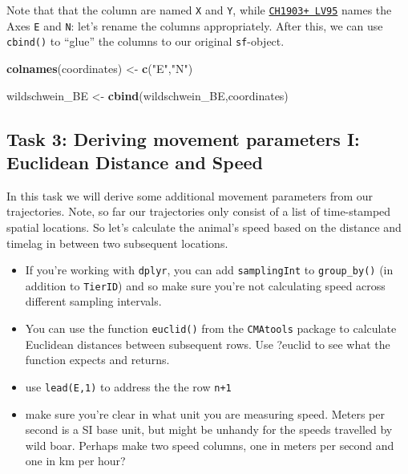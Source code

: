 \documentclass[]{book}
\newenvironment{Shaded}{\begin{snugshade}}{\end{snugshade}}
\newcommand{\KeywordTok}[1]{\textcolor[rgb]{0.13,0.29,0.53}{\textbf{{#1}}}}
\newcommand{\StringTok}[1]{\textcolor[rgb]{0.31,0.60,0.02}{{#1}}}
\newcommand{\NormalTok}[1]{{#1}}
\providecommand{\tightlist}{%
  \setlength{\itemsep}{0pt}\setlength{\parskip}{0pt}}
\theoremstyle{definition}
\theoremstyle{definition}
\theoremstyle{definition}
\theoremstyle{remark}
\begin{document}
Note that that the column are named \texttt{X} and \texttt{Y}, while
\href{https://www.swisstopo.admin.ch/de/wissen-fakten/geodaesie-vermessung/neue-koordinaten.html}{\texttt{CH1903+\ LV95}}
names the Axes \texttt{E} and \texttt{N}: let's rename the columns
appropriately. After this, we can use \texttt{cbind()} to ``glue'' the
columns to our original \texttt{sf}-object.

\begin{Shaded}
\begin{Highlighting}[]
\KeywordTok{colnames}\NormalTok{(coordinates) <-}\StringTok{ }\KeywordTok{c}\NormalTok{(}\StringTok{"E"}\NormalTok{,}\StringTok{"N"}\NormalTok{)}

\NormalTok{wildschwein_BE <-}\StringTok{ }\KeywordTok{cbind}\NormalTok{(wildschwein_BE,coordinates)}
\end{Highlighting}
\end{Shaded}

\subsection{Task 3: Deriving movement parameters I: Euclidean Distance
and
Speed}\label{task-3-deriving-movement-parameters-i-euclidean-distance-and-speed}

In this task we will derive some additional movement parameters from our
trajectories. Note, so far our trajectories only consist of a list of
time-stamped spatial locations. So let's calculate the animal's speed
based on the distance and timelag in between two subsequent locations.

\begin{itemize}
\tightlist
\item
  If you're working with \texttt{dplyr}, you can add
  \texttt{samplingInt} to \texttt{group\_by()} (in addition to
  \texttt{TierID}) and so make sure you're not calculating speed across
  different sampling intervals.
\item
  You can use the function \texttt{euclid()} from the \texttt{CMAtools}
  package to calculate Euclidean distances between subsequent rows. Use
  ?euclid to see what the function expects and returns.
\item
  use \texttt{lead(E,1)} to address the the row \texttt{n+1}
\item
  make sure you're clear in what unit you are measuring speed. Meters
  per second is a SI base unit, but might be unhandy for the speeds
  travelled by wild boar. Perhaps make two speed columns, one in meters
  per second and one in km per hour?
\end{itemize}
\end{document}
